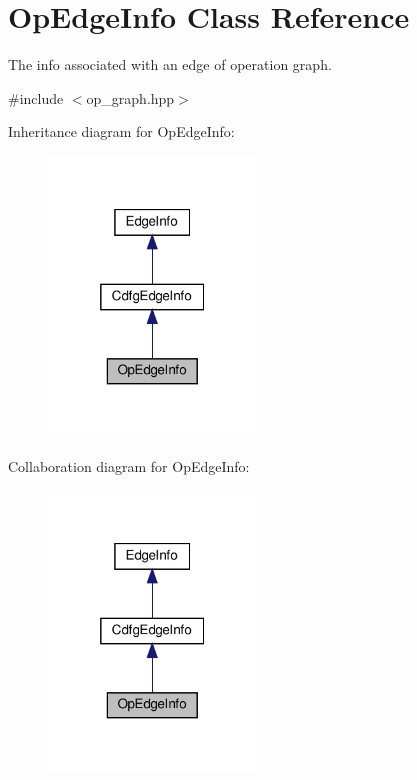 \hypertarget{classOpEdgeInfo}{}\section{Op\+Edge\+Info Class Reference}
\label{classOpEdgeInfo}


The info associated with an edge of operation graph.  




{\ttfamily \#include $<$op\+\_\+graph.\+hpp$>$}



Inheritance diagram for Op\+Edge\+Info\+:
\nopagebreak
\begin{figure}[H]
\begin{center}
\leavevmode
\includegraphics[width=157pt]{da/d7b/classOpEdgeInfo__inherit__graph}
\end{center}
\end{figure}


Collaboration diagram for Op\+Edge\+Info\+:
\nopagebreak
\begin{figure}[H]
\begin{center}
\leavevmode
\includegraphics[width=157pt]{d6/d73/classOpEdgeInfo__coll__graph}
\end{center}
\end{figure}
